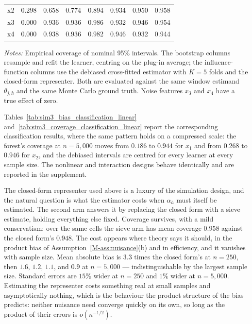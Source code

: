 \documentclass[12pt,a4paper]{article}
\numberwithin{equation}{section}
\theoremstyle{plain}
\theoremstyle{definition}
\begin{document}
\begin{table}[htbp]
\begin{threeparttable}
\begin{tabular}{lrrrrrrr}
				\quad x2 & 0.298 & 0.658 & 0.774 & 0.894 & 0.934 & 0.950 & 0.958 \\
				\quad x3 & 0.000 & 0.936 & 0.936 & 0.986 & 0.932 & 0.946 & 0.954 \\
				\quad x4 & 0.000 & 0.938 & 0.936 & 0.982 & 0.946 & 0.932 & 0.944 \\
				\bottomrule
				\end{tabular}
				\begin{tablenotes}
				\footnotesize
				\item \textit{Notes:} Empirical coverage of nominal 95\% intervals. The bootstrap columns resample and refit the learner, centring on the plug-in average; the influence-function columns use the debiased cross-fitted estimator with $K=5$ folds and the closed-form representer. Both are evaluated against the same window estimand $\theta_{j,h}$ and the same Monte Carlo ground truth. Noise features $x_3$ and $x_4$ have a true effect of zero.
				\end{tablenotes}
		\end{threeparttable}
	\end{table}
	
	Tables~\ref{tab:sim3_bias_classification_linear} and~\ref{tab:sim3_coverage_classification_linear} report the corresponding classification results, where the same pattern holds on a compressed scale: the forest's coverage at $n=5{,}000$ moves from $0.186$ to $0.944$ for $x_1$ and from $0.268$ to $0.946$ for $x_2$, and the debiased intervals are centred for every learner at every sample size. The nonlinear and interaction designs behave identically and are reported in the supplement.
	
	The closed-form representer used above is a luxury of the simulation design, and the natural question is what the estimator costs when $\alpha_h$ must itself be estimated. The second arm answers it by replacing the closed form with a sieve estimate, holding everything else fixed. Coverage survives, with a mild conservatism: over the same cells the sieve arm has mean coverage $0.958$ against the closed form's $0.948$. The cost appears where theory says it should, in the product bias of Assumption~\ref{M-ass:nuisance}(b) and in efficiency, and it vanishes with sample size. Mean absolute bias is $3.3$ times the closed form's at $n=250$, then $1.6$, $1.2$, $1.1$, and $0.9$ at $n=5{,}000$ --- indistinguishable by the largest sample size. Standard errors are $15\%$ wider at $n=250$ and $1\%$ wider at $n=5{,}000$. Estimating the representer costs something real at small samples and asymptotically nothing, which is the behaviour the product structure of the bias predicts: neither nuisance need converge quickly on its own, so long as the product of their errors is $o(n^{-1/2})$.
	
\end{document}
